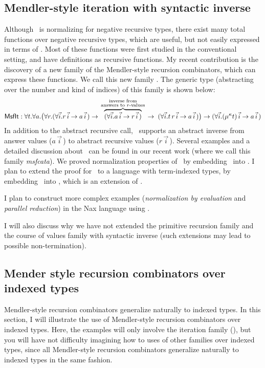 \subsection{Mendler-style iteration with syntactic inverse}
Although \MIt\ is normalizing for negative recursive types, there exist many
total functions over negative recursive types, which are useful, but not easily
expressed in terms of \MIt. Most of these functions were first studied in
the conventional setting, and have definitions as recursive functions.
My recent contribution is the discovery of a new family of the Mendler-style
recursion combinators, which can express these functions. We call this new
family \MsfIt. The generic type (abstracting over the number and kind of
indices) of this family is shown below:
\label{sec:mendler:sf}
\[
 \textsf{MsfIt} : \forall t . \forall a .
   \big( \forall r.
            (\forall\vec{i} . r\,\vec{i} -> a\,\vec{i}\,)
   -> \overset{\begin{smallmatrix}
                        \text{inverse from} \\
                        \text{answers to $r$-values} \\
                       \end{smallmatrix}}{\overbrace{
            (\forall\vec{i} . a\,\vec{i} -> r\,\vec{i}\,) }}
   -> \;    (\forall\vec{i} . t \, r\,\vec{i} -> a\,\vec{i}\,)
   \big)
 -> (\forall\vec{i} . (\mu^\kappa t)\,\vec{i} -> a\,\vec{i}\,)
\]
In addition to the abstract recursive call, \MsfIt\ supports an abstract
inverse from answer values ($a \,\vec{i}\,$) to abstract recursive values
($r\,\vec{i}\,$). Several examples and a detailed discussion about \MsfIt\
can be found in our recent work \cite{AhnShe11} (where we call this family
\textit{msfcata}). We \cite{AhnShe11} proved normalization properties of
\MsfIt\ by embedding \MsfIt\ into \Fw. I plan to extend the proof for \MsfIt\,
to a language with term-indexed types, by embedding \MsfIt\ into \Fi, which is
an extension of \Fw.

I plan to construct more complex examples
(\emph{normalization by evaluation} and \emph{parallel reduction})
in the Nax language using \MsfIt.

I will also discuss why we have not extended the primitive recursion family
and the course of values family with syntactic inverse (such extensions
may lead to possible non-termination).

\subsection{Mender style recursion combinators over indexed types}
\label{sec:mendler:ix}
Mendler-style recursion combinators generalize naturally to indexed types.
In this section, I will illustrate the use of Mendler-style
recursion combinators over indexed types. Here, the examples will only
involve the iteration family (\MIt), but you will have not difficulty
imagining how to uses of other families over indexed types, since all
Mendler-style recursion combinators generalize naturally to indexed types
in the same fashion.

